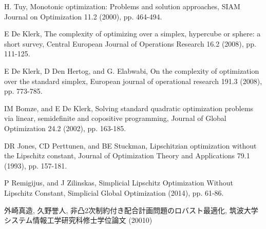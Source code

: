 \documentclass[a4paper,11pt]{jreport}
\begin{document}
\begin{thebibliography}{1}

H. Tuy,
\newblock Monotonic optimization: Problems and solution approaches,
\newblock SIAM Journal on Optimization 11.2 (2000), pp. 464-494.

E De Klerk,
\newblock The complexity of optimizing over a simplex, hypercube or sphere: a short survey,
\newblock Central European Journal of Operations Research 16.2 (2008), pp. 111-125.

E De Klerk, D Den Hertog, and G. Elabwabi,
\newblock On the complexity of optimization over the standard simplex,
\newblock European journal of operational research 191.3 (2008), pp. 773-785.

IM Bomze, and E De Klerk,
\newblock Solving standard quadratic optimization problems via linear, semidefinite and copositive programming,
\newblock Journal of Global Optimization 24.2 (2002), pp. 163-185.

DR Jones, CD Perttunen, and BE Stuckman,
\newblock Lipschitzian optimization without the Lipschitz constant,
\newblock Journal of Optimization Theory and Applications 79.1 (1993), pp. 157-181.

P Remigijus, and J Zilinskas,
\newblock Simplicial Lipschitz Optimization Without Lipschitz Constant,
\newblock Simplicial Global Optimization (2014), pp. 61-86.

外崎真造, 久野誉人,
\newblock 非凸2次制約付き配合計画問題のロバスト最適化,
\newblock 筑波大学システム情報工学研究科修士学位論文 (20010)
\end{thebibliography}
\end{document}
